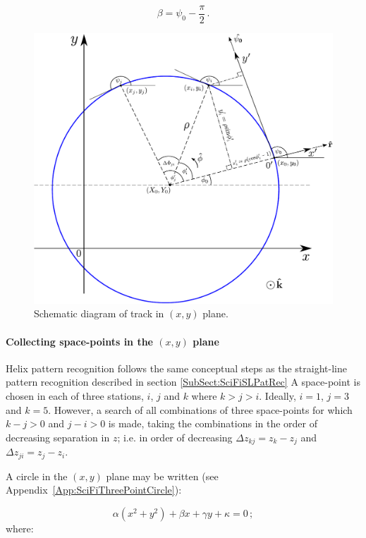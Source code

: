 \begin{equation}
  \beta = \psi_0 - \frac{\pi}{2} \, .
\end{equation}
\begin{figure}
  \begin{center}
    \includegraphics[width=0.85\linewidth]{detectors/tracker/04-Reconstruction/04-03-Pattern-recognition/Figures/Track-model.pdf}
  \end{center}
  \caption{Schematic diagram of track in $(x, y)$ plane.}
  \label{Fig:PatRecTrkMdl}
\end{figure}

\paragraph{Collecting space-points in the $(x, y)$ plane}

Helix pattern recognition follows the same conceptual steps as the straight-line pattern recognition described in section \ref{SubSect:SciFiSLPatRec} A space-point is chosen in each of three stations, $i$, $j$ and $k$ where $k>j>i$. Ideally, $i=1$, $j=3$ and $k=5$. However, a search of all combinations of three space-points for which $k-j>0$ and $j-i>0$ is made, taking the combinations in the order of decreasing separation in $z$; i.e. in order of decreasing $\Delta z_{kj} = z_k - z_j$ and $\Delta z_{ji} = z_j - z_i$. 

A circle in the $(x, y)$ plane may be written (see Appendix~\ref{App:SciFiThreePointCircle}):

\begin{equation}
  \alpha(x^2+y^2) + \beta x + \gamma y + \kappa = 0 \, ;
  \label{Eq:HPRCrclPrm}
\end{equation}
where:

